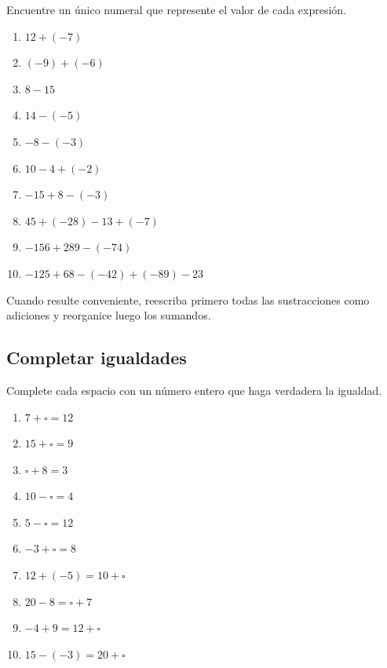 Encuentre un único numeral que represente el valor de cada expresión.
\begin{enumerate}
\item \(12+(-7)\)

\item \((-9)+(-6)\)

\item \(8-15\)

\item \(14-(-5)\)

\item \(-8-(-3)\)

\item \(10-4+(-2)\)

\item \(-15+8-(-3)\)

\item \(45+(-28)-13+(-7)\)

\item \(-156+289-(-74)\)

\item \(-125+68-(-42)+(-89)-23\)
\end{enumerate}

Cuando resulte conveniente, reescriba primero todas las sustracciones como adiciones y reorganice luego los sumandos.

\subsection*{Completar igualdades}

Complete cada espacio con un número entero que haga verdadera la igualdad.

\begin{enumerate}
\item \(7+\square=12\)

\item \(15+\square=9\)

\item \(\square+8=3\)

\item \(10-\square=4\)

\item \(5-\square=12\)

\item \(-3+\square=8\)

\item \(12+(-5)=10+\square\)

\item \(20-8=\square+7\)

\item \(-4+9=12+\square\)

\item \(15-(-3)=20+\square\)
\end{enumerate}


